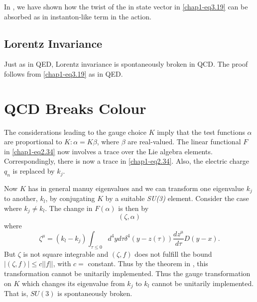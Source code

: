 In \cite{key4}, we have shown how the twist of the in state vector in \eqref{chap1-eq3.19} can be absorbed as in instanton-like term in the action.

\vspace{-.3cm}

\subsection{Lorentz Invariance}\label{chap1-sec3.2}

\vspace{-.1cm}

Just as in QED, Lorentz invariance is spontaneously broken in QCD. The proof follows from \eqref{chap1-eq3.19} as in QED.

\vspace{-.3cm}

\section{QCD Breaks Colour}\label{chap1-sec4}

\vspace{-.15cm}

The considerations leading to the gauge choice $K$ imply that the test functions $\alpha$ are proportional to $K: \alpha = K \beta$, where $\beta$ are real-valued. The linear functional $F$ in \eqref{chap1-eq2.34} now involves a trace over the Lie algebra elements. Correspondingly, there is now a trace in \eqref{chap1-eq2.34}. Also, the electric charge $q_n$ is replaced by $k_j$.

Now $K$ has in general manuy eigenvalues and we can transform one eigenvalue $k_j$ to another, $k_l$, by conjugating $K$ by a suitable \textit{SU(3)} element. Consider the case where $k_j \neq k_l$. The change in $F(\alpha)$ is then by
\begin{equation}
(\zeta, \alpha) \label{chap1-eq4.1}
\end{equation}
where
\begin{equation}
  \zeta^\mu = (k_l - k_j) \int_{\tau \leq 0} d^4 y d\tau \delta^4 (y -z(\tau)) \frac{dz^\mu}{d \tau} D (y-x). \label{chap1-eq4.2}
\end{equation}
But $\zeta$ is not square integrable and $(\zeta, f)$ does not fulfill the bound $|(\zeta, f)|\leq c || f ||$, with $c=$ constant. Thus by the theorem in \cite{key6}, this transformation cannot be unitarily implemented. Thus the gauge transformation on $K$ which changes its eigenvalue from $k_j$ to $k_l$ cannot be unitarily implemented. That is, $SU(3)$ is spontaneously broken.

